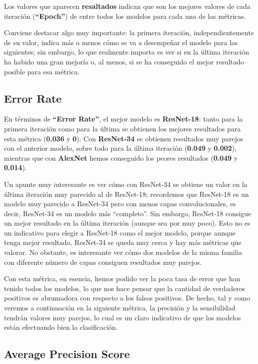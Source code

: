 Los valores que aparecen \textbf{resaltados} indican que son los mejores valores de cada iteración (\textbf{``Epoch''}) de entre todos los modelos para cada una de las métricas.

Conviene destacar algo muy importante: la primera iteración, independientemente de su valor, indica más o menos cómo se va a desempeñar el modelo para las siguientes; sin embargo, lo que realmente importa es ver si en la última iteración ha habido una gran mejoría o, al menos, si se ha conseguido el mejor resultado posible para esa métrica.

\subsection{Error Rate}

En términos de \textbf{``Error Rate''}, el mejor modelo es \textbf{ResNet-18}: tanto para la primera iteración como para la última se obtienen los mejores resultados para esta métrica (\textbf{0.036} y \textbf{0}). Con \textbf{ResNet-34} se obtienen resultados muy parejos con el anterior modelo, sobre todo para la última iteración (\textbf{0.049} y \textbf{0.002}), mientras que con \textbf{AlexNet} hemos conseguido los peores resultados (\textbf{0.049} y \textbf{0.014}).

Un apunte muy interesante es ver cómo con ResNet-34 se obtiene un valor en la última iteración muy parecido al de ResNet-18; recordemos que ResNet-18 es un modelo muy parecido a ResNet-34 pero con menos capas convolucionales, es decir, ResNet-34 es un modelo más ``completo''. Sin embargo, ResNet-18 consigue un mejor resultado en la última iteración (aunque sea por muy poco). Esto no es un indicativo para elegir a ResNet-18 como el mejor modelo, porque aunque tenga mejor resultado, ResNet-34 se queda muy cerca y hay más métricas que valorar. No obstante, es interesante ver cómo dos modelos de la misma familia con diferente número de capas consiguen resultados muy parejos.

Con esta métrica, en esencia, hemos podido ver la poca tasa de error que han tenido todos los modelos, lo que nos hace pensar que la cantidad de verdaderos positivos es abrumadora con respecto a los falsos positivos. De hecho, tal y como veremos a continuación en la siguiente métrica, la precisión y la sensibilidad tendrán valores muy parejos, lo cual es un claro indicativo de que los modelos están efectuando bien la clasificación.

\subsection{Average Precision Score}


